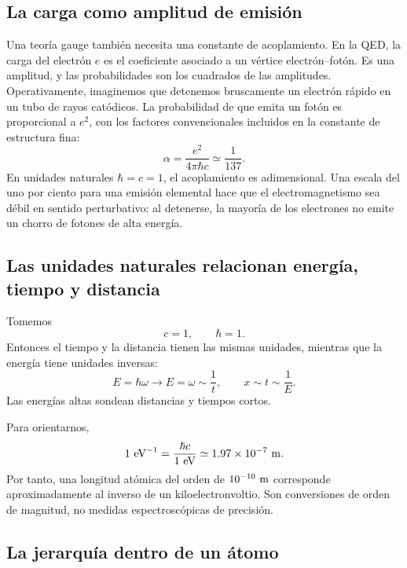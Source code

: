 \subsection{La carga como amplitud de emisión}

Una teoría gauge también necesita una constante de acoplamiento. En la QED, la carga del electrón \(e\) es el coeficiente asociado a un vértice electrón--fotón. Es una amplitud, y las probabilidades son los cuadrados de las amplitudes. Operativamente, imaginemos que detenemos bruscamente un electrón rápido en un tubo de rayos catódicos. La probabilidad de que emita un fotón es proporcional a \(e^2\), con los factores convencionales incluidos en la constante de estructura fina:
\begin{equation}
\alpha=\frac{e^2}{4\pi\hbar c}
\simeq \frac{1}{137}.
\label{eq:l5-alpha}
\end{equation}
En unidades naturales \(\hbar=c=1\), el acoplamiento es adimensional. Una escala del uno por ciento para una emisión elemental hace que el electromagnetismo sea débil en sentido perturbativo: al detenerse, la mayoría de los electrones no emite un chorro de fotones de alta energía.

\subsection{Las unidades naturales relacionan energía, tiempo y distancia}

Tomemos
\begin{equation}
c=1,
\qquad
\hbar=1.
\end{equation}
Entonces el tiempo y la distancia tienen las mismas unidades, mientras que la energía tiene unidades inversas:
\begin{equation}
E=\hbar\omega\longrightarrow E=\omega\sim\frac1t,
\qquad
x\sim t\sim\frac1E.
\end{equation}
Las energías altas sondean distancias y tiempos cortos.

Para orientarnos,
\begin{equation}
1\ {\rm eV}^{-1}
=\frac{\hbar c}{1\ {\rm eV}}
\simeq 1.97\times10^{-7}\ {\rm m}.
\end{equation}
Por tanto, una longitud atómica del orden de \(10^{-10}\ {\rm m}\) corresponde aproximadamente al inverso de un kiloelectronvoltio. Son conversiones de orden de magnitud, no medidas espectroscópicas de precisión.

\subsection{La jerarquía dentro de un átomo}

